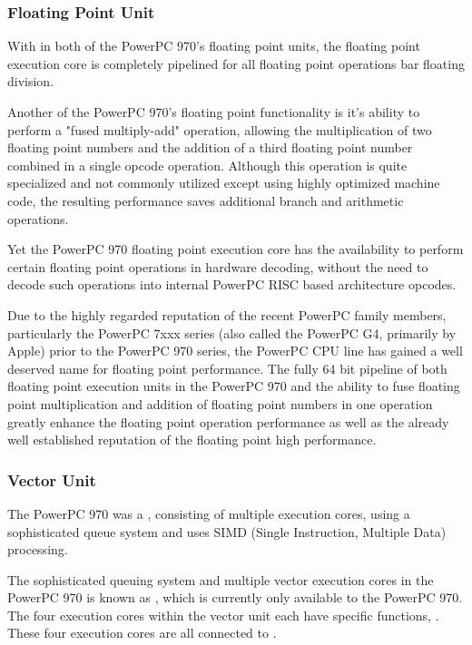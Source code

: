 \documentclass[a4paper,12pt]{article}
\begin{document}
\subsubsection{Floating Point Unit}

With \cite[80 registers, (32 PowerPC architectural registers and 48
rename registers)]{a2} in both of the PowerPC 970's floating point units, the
floating point execution core is completely pipelined for all floating
point operations bar floating division. 


Another \cite[well renoweded feature]{a5} of the PowerPC 970's floating
point functionality is it's ability to perform a "fused multiply-add"
operation, allowing the multiplication of two floating point numbers and
the addition of a third floating point number combined in a single
opcode operation. Although this operation is quite specialized and not
commonly utilized except using highly optimized machine code, the resulting
performance saves additional branch and arithmetic operations. 


Yet \cite[another key feature]{a2} the PowerPC 970 floating point execution core 
has the availability to perform certain floating point operations in
hardware decoding, without the need to decode such operations into
internal PowerPC RISC based architecture opcodes.


Due to the highly regarded reputation of the recent PowerPC family
members, particularly the PowerPC 7xxx series (also called the PowerPC
G4, primarily by Apple) prior to the PowerPC 970 series, the PowerPC 
CPU line has gained a well deserved name 
for floating point performance. The fully 64 bit pipeline of both 
floating point execution units in the PowerPC 970 and the ability to fuse 
floating point multiplication and addition of floating point numbers in 
one operation greatly enhance the floating point operation performance as 
well as the already well established reputation of the floating point high 
performance. 

\subsubsection{Vector Unit}

The PowerPC 970 was a \cite[128 bit vector processing unit (called the
Velocity Engine by Apple Computers)]{a5}, consisting of multiple
execution cores, using a sophisticated queue system and uses SIMD
(Single Instruction, Multiple Data) processing.


The sophisticated queuing system and multiple vector execution cores in
the PowerPC 970 is known as \cite[VMX (or AltiVec, Motorola's
trade marked term)]{a2}, which is currently only available to the PowerPC
970. The four execution cores within the vector unit each have specific
functions, \cite[one permute unit, one simple integer unit, one complex
integer unit and one floating point unit.]{a2}. These four execution
cores are all connected to \cite[a register file containing thirty two
128 bit precision architectural registers and sixteen rename
registers]{a2}.
\end{document}

